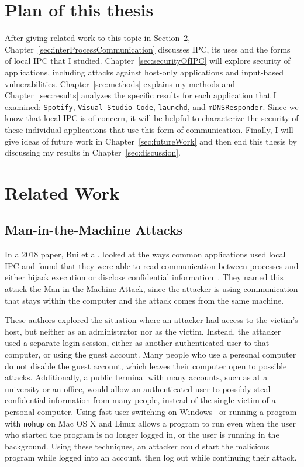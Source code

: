 \section{Plan of this thesis}
\label{sec:planOfThesis}
After giving related work to this topic in Section~\ref{sec:relatedWork}, Chapter~\ref{sec:interProcessCommunication} discusses IPC, its uses and the forms of local IPC that I studied.  Chapter~\ref{sec:securityOfIPC} will explore security of applications, including attacks against host-only applications and input-based vulnerabilities.  Chapter~\ref{sec:methods} explains my methods and Chapter~\ref{sec:results} analyzes the specific results for each application that I examined: \texttt{Spotify}, \texttt{Visual Studio Code}, \texttt{launchd}, and \texttt{mDNSResponder}.  Since we know that local IPC is of concern, it will be helpful to characterize the security of these individual applications that use this form of communication.  Finally, I will give ideas of future work in Chapter~\ref{sec:futureWork} and then end this thesis by discussing my results in Chapter~\ref{sec:discussion}.


\section{Related Work}
\label{sec:relatedWork}
\subsection{Man-in-the-Machine Attacks}
\label{sec:manInMachineAttack}
In a 2018 paper, Bui et al. looked at the ways common applications used local IPC and found that they were able to read communication between processes and either hijack execution or disclose confidential information~\cite{MitMa}.  They named this attack the Man-in-the-Machine Attack, since the attacker is using communication that stays within the computer and the attack comes from the same machine.

These authors explored the situation where an attacker had access to the victim's host, but neither as an administrator nor as the victim.  Instead, the attacker used a separate login session, either as another authenticated user to that computer, or using the guest account.  Many people who use a personal computer do not disable the guest account, which leaves their computer open to possible attacks.  Additionally, a public terminal with many accounts, such as at a university or an office, would allow an authenticated user to possibly steal confidential information from many people, instead of the single victim of a personal computer.  Using fast user switching on Windows~\cite{microsoft_developers_network_2018} or running a program with \texttt{nohup} on Mac OS X and Linux allows a program to run even when the user who started the program is no longer logged in, or the user is running in the background.  Using these techniques, an attacker could start the malicious program while logged into an account, then log out while continuing their attack.

